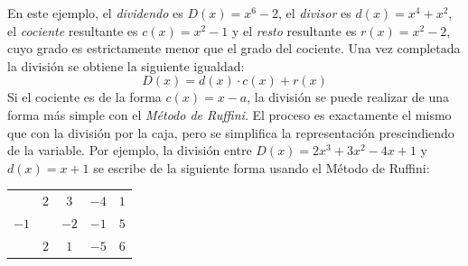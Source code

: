 En este ejemplo, el \emph{dividendo} es $D(x)=x^6-2$, el \emph{divisor} es $d(x)=x^4+x^2$, el \emph{cociente} resultante es $c(x)=x^2-1$ y el \emph{resto} resultante es $r(x)=x^2-2$, cuyo grado es estrictamente menor que el grado del cociente.
Una vez completada la división se obtiene la siguiente igualdad:
\[
D(x)= d(x)\cdot c(x)+ r(x)
\]
%
Si el cociente es de la forma $c(x)=x-a$, la división se puede realizar de una forma más simple con el \emph{Método de Ruffini}.
El proceso es exactamente el mismo que con la división por la caja, pero se simplifica la representación prescindiendo de la variable.
Por ejemplo, la división entre $D(x)=2x^3+3x^2-4x+1$ y $d(x)=x+1$ se escribe de la siguiente forma usando el Método de Ruffini:
\begin{center}
\begin{tabular}{r|cccc}
   & $2$ &  $3$ & $-4$ & $1$ \\
$-1$ &   & $-2$ & $-1$ & $5$ \\\hline
   & $2$ &  $1$ & $-5$ & \multicolumn{1}{|r}{$6$} \\\cline{5-5}
\end{tabular}
\end{center}
